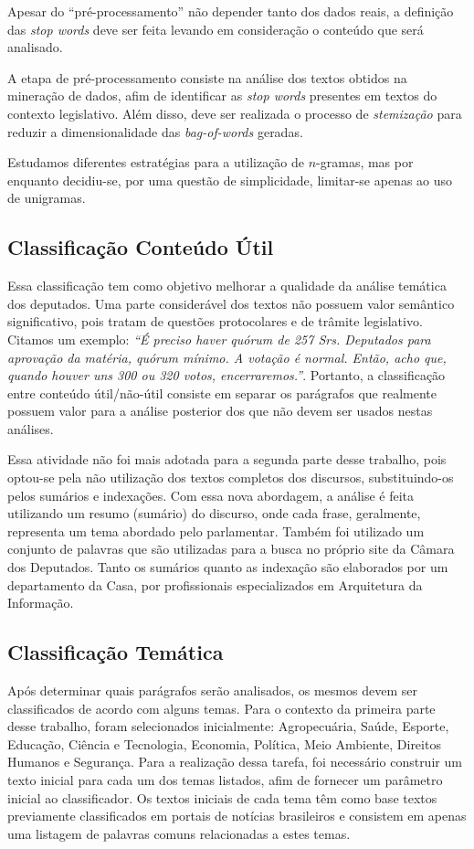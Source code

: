 Apesar do ``pré-processamento'' não depender tanto dos dados reais, a definição das \textit{stop words} deve ser feita levando em consideração o conteúdo que será analisado.

A etapa de pré-processamento consiste na análise dos textos obtidos na mineração de dados, afim de identificar as \textit{stop words} presentes em textos do contexto legislativo. Além disso, deve ser realizada o processo de \textit{stemização} para reduzir a dimensionalidade das \textit{bag-of-words} geradas.

Estudamos diferentes estratégias para a utilização de \(n\)-gramas, mas por enquanto decidiu-se, por uma questão de simplicidade, limitar-se apenas ao uso de unigramas.

\subsection{Classificação Conteúdo Útil}

Essa classificação tem como objetivo melhorar a qualidade da análise temática dos deputados. Uma parte considerável dos textos não possuem valor semântico significativo, pois tratam de questões protocolares e de trâmite legislativo. Citamos um exemplo: \textit{``É preciso haver quórum de 257 Srs. Deputados para aprovação da matéria, quórum mínimo. A votação é normal. Então, acho que, quando houver uns 300 ou 320 votos, encerraremos.''}. Portanto, a classificação entre conteúdo útil/não-útil consiste em separar os parágrafos que realmente possuem valor para a análise posterior dos que não devem ser usados nestas análises.

Essa atividade não foi mais adotada para a segunda parte desse trabalho, pois optou-se pela não utilização dos textos completos dos discursos, substituindo-os pelos sumários e indexações. Com essa nova abordagem, a análise é feita utilizando um resumo (sumário) do discurso, onde cada frase, geralmente, representa um tema abordado pelo parlamentar. Também foi utilizado um conjunto de palavras que são utilizadas para a busca no próprio site da Câmara dos Deputados. Tanto os sumários quanto as indexação são elaborados por um departamento da Casa, por profissionais especializados em Arquitetura da Informação.

\subsection{Classificação Temática}

Após determinar quais parágrafos serão analisados, os mesmos devem ser classificados de acordo com alguns temas. Para o contexto da primeira parte desse trabalho, foram selecionados inicialmente: Agropecuária, Saúde, Esporte, Educação, Ciência e Tecnologia, Economia, Política, Meio Ambiente, Direitos Humanos e Segurança. Para a realização dessa tarefa, foi necessário construir um texto inicial para cada um dos temas listados, afim de fornecer um parâmetro inicial ao classificador. Os textos iniciais de cada tema têm como base textos previamente classificados em portais de notícias brasileiros e consistem em apenas uma listagem de palavras comuns relacionadas a estes temas.

